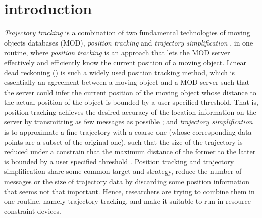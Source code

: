 

\section{introduction}
\label{sec-intro}


\textit{Trajectory tracking} \cite{Lange:Tracking} is a combination of two fundamental technologies of moving objects databases (MOD), \textit{position tracking} \cite{Wolfson:PositionTracking,Leonhardi:Comparison} and \textit{trajectory simplification} \cite{Lin:Cised,Zhang:Evaluation}, in one routine, where \textit{position tracking} is an approach that lets the MOD server effectively and efficiently know the current position of a moving object. Linear dead reckoning (\ldr) \cite{Wolfson:PositionTracking} is such a widely used position tracking method, which is essentially an agreement between a moving object and a MOD server such that the server could infer the current position of the moving object whose distance to the actual position of the object is bounded by a user specified threshold. That is, position tracking achieves the desired accuracy of the location information on the server by transmitting as few messages as possible \cite{Leonhardi:Comparison};
%
and \textit{trajectory simplification} is to approximate a fine trajectory with a coarse one (whose corresponding data points are a subset of the original one), such that the size of the trajectory is reduced under a constrain that the maximum distance of the former to the latter is bounded by a user specified threshold \cite{Lin:Cised,Zhang:Evaluation}. 
%
Position tracking and trajectory simplification share some common target and strategy, \ie reduce the number of messages or the size of trajectory data by discarding some position information that seems not that important. Hence, researchers are trying to combine them in one routine, namely trajectory tracking, and make it suitable to run in resource constraint devices.

